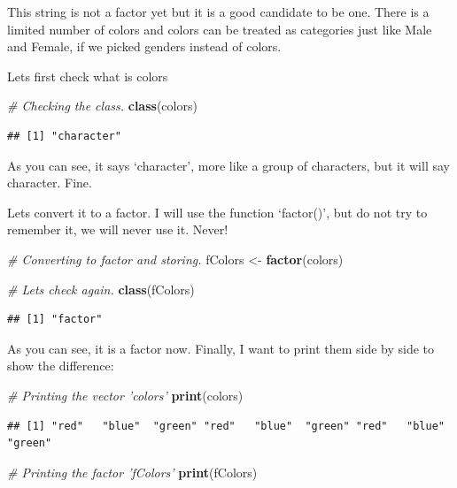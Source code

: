 \documentclass[]{book}
\newenvironment{Shaded}{\begin{snugshade}}{\end{snugshade}}
\newcommand{\CommentTok}[1]{\textcolor[rgb]{0.56,0.35,0.01}{\textit{#1}}}
\newcommand{\KeywordTok}[1]{\textcolor[rgb]{0.13,0.29,0.53}{\textbf{#1}}}
\newcommand{\NormalTok}[1]{#1}
\newcommand{\StringTok}[1]{\textcolor[rgb]{0.31,0.60,0.02}{#1}}
\begin{document}
This string is not a factor yet but it is a good candidate to be one. There is a limited number of colors and colors can be treated as categories just like Male and Female, if we picked genders instead of colors.

Lets first check what is colors

\begin{Shaded}
\begin{Highlighting}[]
\CommentTok{# Checking the class.}
\KeywordTok{class}\NormalTok{(colors)}
\end{Highlighting}
\end{Shaded}

\begin{verbatim}
## [1] "character"
\end{verbatim}

As you can see, it says `character', more like a group of characters, but it will say character. Fine.

Lets convert it to a factor. I will use the function `factor()', but do not try to remember it, we will never use it. Never!

\begin{Shaded}
\begin{Highlighting}[]
\CommentTok{# Converting to factor and storing.}
\NormalTok{fColors <-}\StringTok{ }\KeywordTok{factor}\NormalTok{(colors)}

\CommentTok{# Lets check again.}
\KeywordTok{class}\NormalTok{(fColors)}
\end{Highlighting}
\end{Shaded}

\begin{verbatim}
## [1] "factor"
\end{verbatim}

As you can see, it is a factor now. Finally, I want to print them side by side to show the difference:

\begin{Shaded}
\begin{Highlighting}[]
\CommentTok{# Printing the vector 'colors'}
\KeywordTok{print}\NormalTok{(colors)}
\end{Highlighting}
\end{Shaded}

\begin{verbatim}
## [1] "red"   "blue"  "green" "red"   "blue"  "green" "red"   "blue"  "green"
\end{verbatim}

\begin{Shaded}
\begin{Highlighting}[]
\CommentTok{# Printing the factor 'fColors'}
\KeywordTok{print}\NormalTok{(fColors)}
\end{Highlighting}
\end{Shaded}
\end{document}
